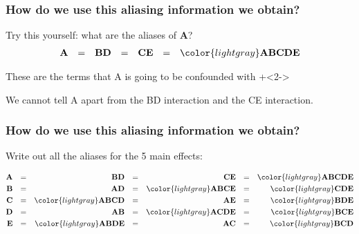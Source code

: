 \begin{frame}\frametitle{How do we use this aliasing information we obtain?}
	Try this yourself: what are the aliases of \textbf{A}?
	\pause
	\begin{align*}
		\textbf{A} &&=&& \textbf{BD} &&=&& \textbf{CE} &&=&&\color{lightgray} \textbf{ABCDE}
	\end{align*}
		
	\vspace{1cm}
	\begin{itemize}
		\item	These are the terms that A is going to be confounded with
		\onslide+<2->{\item	We cannot tell A apart from the BD interaction and the CE interaction.}
	\end{itemize}
\end{frame}

\begin{frame}\frametitle{How do we use this aliasing information we obtain?}
	
	\vspace{1cm}
	Write out all the aliases for the 5 main effects:
	
	\vspace{0.5cm}
	\begin{align*}
		\textbf{A} &&=&& \textbf{BD} &&=&& \textbf{CE} &&=&&\color{lightgray} \textbf{ABCDE}\\
		\textbf{B} &&=&& \textbf{AD} &&=&& {\color{lightgray}\textbf{ABCE}} &&=&& \color{lightgray} \textbf{CDE}\\
		\textbf{C} &&=&& \color{lightgray}\textbf{ABCD} &&=&& \textbf{AE} &&=&&\color{lightgray} \textbf{BDE}\\
		\textbf{D} &&=&& \textbf{AB} &&=&& \color{lightgray} \textbf{ACDE} &&=&& \color{lightgray}\textbf{BCE} \\
		\textbf{E} &&=&& \color{lightgray} \textbf{ABDE} &&=&& \textbf{AC} &&=&&\color{lightgray} \textbf{BCD}\\
	\end{align*}
	
\end{frame}


